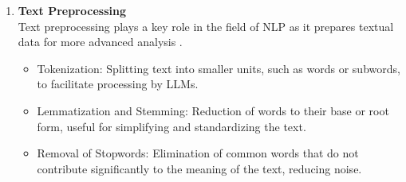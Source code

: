 \begin{enumerate}
 \item \textbf{Text Preprocessing}\\ Text preprocessing plays a key role in the field of NLP as it prepares textual data for more advanced analysis \cite{smith2020preprocessing}.
 \begin{itemize}
    \item Tokenization: Splitting text into smaller units, such as words or subwords, to facilitate processing by LLMs.
    \item Lemmatization and Stemming: Reduction of words to their base or root form, useful for simplifying and standardizing the text.
    \item Removal of Stopwords: Elimination of common words that do not contribute significantly to the meaning of the text, reducing noise.
 \end{itemize}


\end{enumerate}
